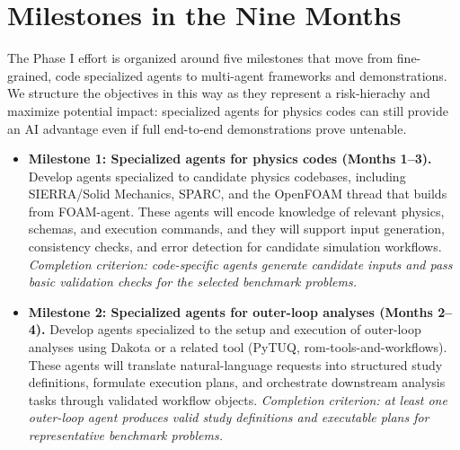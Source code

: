 \documentclass[11pt]{article} \usepackage[margin=1in]{geometry}
\begin{document}
\section{Milestones in the Nine Months}
The Phase I effort is organized around five milestones that move from fine-grained, code specialized agents to multi-agent frameworks and demonstrations. We structure the objectives in this way as they represent a risk-hierachy and maximize potential impact: specialized agents for physics codes can still provide an AI advantage even if full end-to-end demonstrations prove untenable. 

\begin{itemize}[leftmargin=1.2em,itemsep=0.2em,topsep=0.2em]
\item \textbf{Milestone 1: Specialized agents for physics codes (Months 1--3).}
Develop agents specialized to candidate physics codebases, including
SIERRA/Solid Mechanics, SPARC, and the OpenFOAM thread that builds from
FOAM-agent. These agents will encode knowledge of relevant physics, schemas,
and execution commands, and they will support input generation, consistency
checks, and error detection for candidate simulation workflows.
\textit{Completion criterion: code-specific agents generate candidate inputs
and pass basic validation checks for the selected benchmark problems.}

\item \textbf{Milestone 2: Specialized agents for outer-loop analyses (Months
2--4).} Develop agents specialized to the setup and execution of outer-loop
analyses using Dakota or a related tool (PyTUQ, rom-tools-and-workflows). These agents
will translate natural-language requests into structured study definitions,
formulate execution plans, and orchestrate downstream analysis tasks through
validated workflow objects. \textit{Completion criterion: at least one
outer-loop agent produces valid study definitions and executable plans for
representative benchmark problems.}



\end{itemize}
\end{document}
